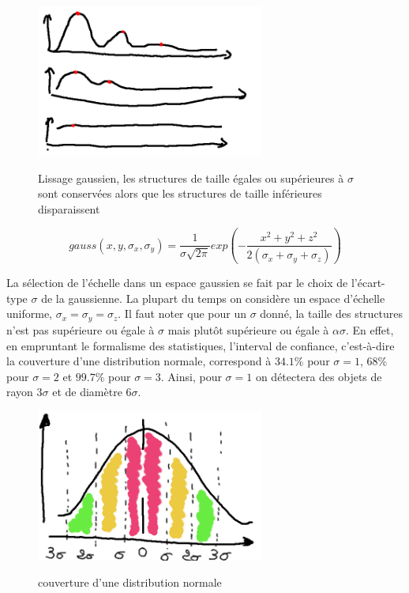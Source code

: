 {\begin{figure}
  \centering
  \includegraphics[height=5cm]{Images/gaussian_smoothing.png}
  \label{fig:gaussian_smoothing}
  \caption{Lissage gaussien, les structures de taille égales ou supérieures à $\sigma$ sont conservées alors que les structures de taille inférieures disparaissent}
\end{figure}

\begin{equation}
  gauss(x,y,\sigma_{x},\sigma_{y}) = \frac{1}{ \sigma\sqrt{2\pi} }exp(-\frac{x^2 + y^2 + z^2}{2(\sigma_{x}+ \sigma_{y}+ \sigma_{z}) })
\end{equation}

La sélection de l'échelle dans un espace gaussien se fait par le choix de l'écart-type $\sigma$ de la gaussienne. La plupart du temps on considère un espace d'échelle uniforme, $\sigma_x = \sigma_y = \sigma_z$. Il faut noter que pour un $\sigma$ donné, la taille des structures n'est pas supérieure ou égale à $\sigma$ mais plutôt supérieure ou égale à $\alpha\sigma$. En effet, en empruntant le formalisme des statistiques, l'interval de confiance, c'est-à-dire la couverture d'une distribution normale, correspond à $34.1\%$ pour $\sigma=1$, $68\%$ pour $\sigma=2$ et $99.7\%$ pour $\sigma=3$. Ainsi, pour $\sigma=1$ on détectera des objets de rayon $3\sigma$ et de diamètre $6\sigma$.  

\begin{figure}
  \centering
  \includegraphics[height=5cm]{Images/normal_distribution_probability_coverage.png}
  \label{fig:normal_distribution_probability_coverage}
  \caption{couverture d'une distribution normale}
\end{figure}

}
